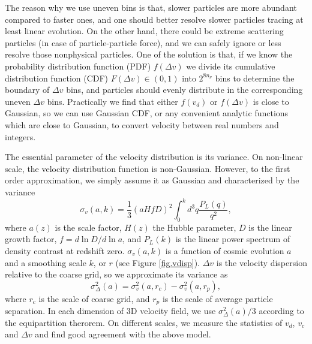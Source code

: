 \documentclass[10pt,twocolumn,preprint]{emulateapj}
\begin{document}
The reason why we use uneven bins is that, slower particles are more abundant compared to faster ones, and one should better resolve slower particles tracing at least linear evolution. On the other hand, there could be extreme scattering particles (in case of particle-particle force), and we can safely ignore or less resolve those nonphysical particles. One of the solution is that, if we know the probability distribution function (PDF) $f(\Delta v)$ we divide its cumulative distribution function (CDF) $F(\Delta v)\in(0,1)$ into $2^{8n_\nu}$ bins to determine the boundary of $\Delta v$ bins, and particles should evenly distribute in the corresponding uneven $\Delta v$ bins. Practically we find that either $f(v_d)$ or $f(\Delta v)$ is close to Gaussian, so we can use Gaussian CDF, or any convenient analytic functions which are close to Gaussian, to convert velocity between real numbers and integers.

The essential parameter of the velocity distribution is its variance. On non-linear scale, the velocity distribution function is non-Gaussian. However, to the first order approximation, we simply assume it as Gaussian and characterized by the variance
\begin{equation}\label{eq.vdisp}
	\sigma_v(a,k) = \frac{1}{3}  (a H f D)^2 \int_0^kd^3q\frac{P_{L}(q)}{q^2},
\end{equation}
where $a(z)$ is the scale factor, $H(z)$ the Hubble parameter, $D$ is the linear growth factor, $f=d \ln D/d\ln a$, and $P_L(k)$ is the linear power spectrum of density contrast at redshift zero. $\sigma_v(a,k)$ is a function of cosmic evolution $a$ and a smoothing scale $k$, or $r$ (see Figure \ref{fig.vdisp}). $\Delta v$ is the velocity dispersion relative to the coarse grid, so we approximate its variance as
\begin{equation}\label{eq.vdelta}
	\sigma^2_{\Delta}(a)=\sigma^2_v(a,r_c)-\sigma^2_v(a,r_p), 
\end{equation}
where $r_c$ is the scale of coarse grid, and $r_p$ is the scale of average particle separation. In each dimension of 3D velocity field, we use $\sigma^2_{\Delta}(a)/3$ according to the equipartition therorem. On different scales, we measure the statistics of $v_d$, $v_c$ and $\Delta v$ and find good agreement with the above model.
\end{document}
